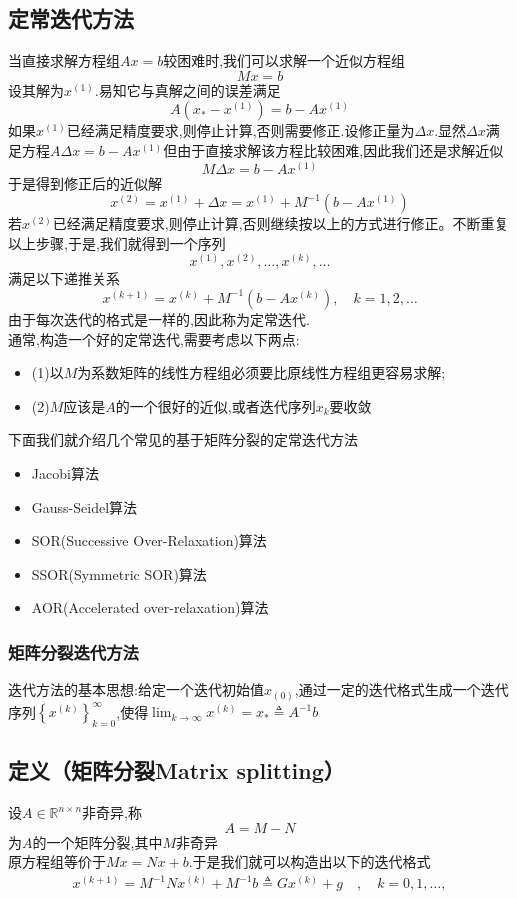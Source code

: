 \documentclass[12pt,a4paper]{article}
\begin{document}
\subsection{定常迭代方法}
当直接求解方程组$Ax=b$较困难时,我们可以求解一个近似方程组
$$
M x=b
$$
设其解为$x^{(1)}$.易知它与真解之间的误差满足
$$
A\left(x_{*}-x^{(1)}\right)=b-A x^{(1)}
$$
如果$x^{(1)}$已经满足精度要求,则停止计算,否则需要修正.设修正量为$\Delta x$.显然$\Delta x$满足方程$A \Delta x=b-A x^{(1)}$但由于直接求解该方程比较困难,因此我们还是求解近似
$$
M \Delta x=b-A x^{(1)}
$$
于是得到修正后的近似解
$$x^{(2)}=x^{(1)}+\Delta x=x^{(1)}+M^{-1}\left(b-A x^{(1)}\right)$$
若$x^{(2)}$已经满足精度要求,则停止计算,否则继续按以上的方式进行修正。不断重复以上步骤,于是,我们就得到一个序列
$$
x^{(1)}, x^{(2)}, \ldots, x^{(k)}, \ldots
$$
满足以下递推关系
$$
x^{(k+1)}=x^{(k)}+M^{-1}\left(b-A x^{(k)}\right), \quad k=1,2, \ldots
$$
{\color{blue}由于每次迭代的格式是一样的,因此称为\quad 定常迭代.}\\
通常,构造一个好的定常迭代,需要考虑以下两点:
\begin{itemize}
\item (1)\quad 以$M$为系数矩阵的线性方程组必须要比原线性方程组更容易求解;
\item (2)\quad $M$应该是$A$的一个很好的近似,或者迭代序列${x_k}$要收敛
\end{itemize}
下面我们就介绍几个常见的基于矩阵分裂的定常迭代方法
\begin{itemize}
\item Jacobi算法
\item Gauss-Seidel算法
\item SOR(Successive Over-Relaxation)算法
\item SSOR(Symmetric SOR)算法
\item AOR(Accelerated over-relaxation)算法
\end{itemize}
\subsubsection{矩阵分裂迭代方法}
迭代方法的基本思想:给定一个迭代初始值$x_{(0)}$,通过一定的迭代格式生成一个迭代序列$\left\{x^{(k)}\right\}_{k=0}^{\infty}$,使得$\lim _{k \rightarrow \infty} x^{(k)}=x_{*} \triangleq A^{-1} b$
\subsection*{定义（矩阵分裂Matrix splitting）}设$A \in \mathbb{R}^{n \times n}$非奇异,称
$$
A=M-N
$$
为$A$的一个矩阵分裂,其中$M$非奇异\\
原方程组等价于$M x=N x+b$.于是我们就可以构造出以下的迭代格式
\begin{align}
x^{(k+1)}=M^{-1} N x^{(k)}+M^{-1} b \triangleq G x^{(k)}+g \quad, \quad k=0,1, \ldots,\tag{6.7}
\end{align}
\end{document}
